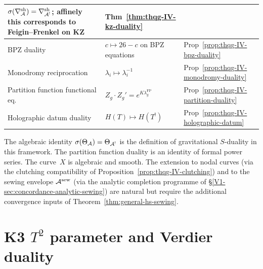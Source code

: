 \begin{center}
\begin{tabular}{|>{\raggedright\arraybackslash}p{5.5cm}|%
 >{\raggedright\arraybackslash}p{5.5cm}|%
 >{\raggedright\arraybackslash}p{3cm}|}
$\sigma(\nabla^{\mathrm{sh}}_{\mathcal{A}})=\nabla^{\mathrm{sh}}_{\mathcal{A}^!}$;
affinely this corresponds to Feigin--Frenkel on KZ &
Thm~\ref{thm:thqg-IV-kz-duality} \\
\hline
BPZ duality &
$c \mapsto 26-c$ on BPZ equations &
Prop~\ref{prop:thqg-IV-bpz-duality} \\
\hline
Monodromy reciprocation &
$\lambda_i \mapsto \lambda_i^{-1}$ &
Prop~\ref{prop:thqg-IV-monodromy-duality} \\
\hline
Partition function functional eq. &
$Z_g \cdot Z_g' = e^{K\lambda_g^{\mathrm{FP}}}$ &
Prop~\ref{prop:thqg-IV-partition-duality} \\
\hline
Holographic datum duality &
$H(T) \mapsto H(T^!)$ &
Prop~\ref{prop:thqg-IV-holographic-datum} \\
\hline
\end{tabular}
\end{center}

\begin{remark}
The algebraic identity $\sigma(\Theta_{\mathcal{A}}) = \Theta_{\mathcal{A}^!}$ is the
definition of gravitational $S$-duality in this framework. The
partition function duality is an identity of formal power series.
The curve~$X$ is algebraic and smooth. The extension to nodal
curves (via the clutching compatibility of
Proposition~\ref{prop:thqg-IV-clutching}) and to the sewing envelope
$\mathcal{A}^{\mathrm{sew}}$ (via the analytic completion programme of
\S\ref{V1-sec:concordance-analytic-sewing}) are natural but require
the additional convergence inputs of Theorem~\ref{thm:general-hs-sewing}.
\end{remark}

\section{K3 \texorpdfstring{$T^2$}{T2} parameter and Verdier duality}
\label{sec:grav-sdual-supplement}

